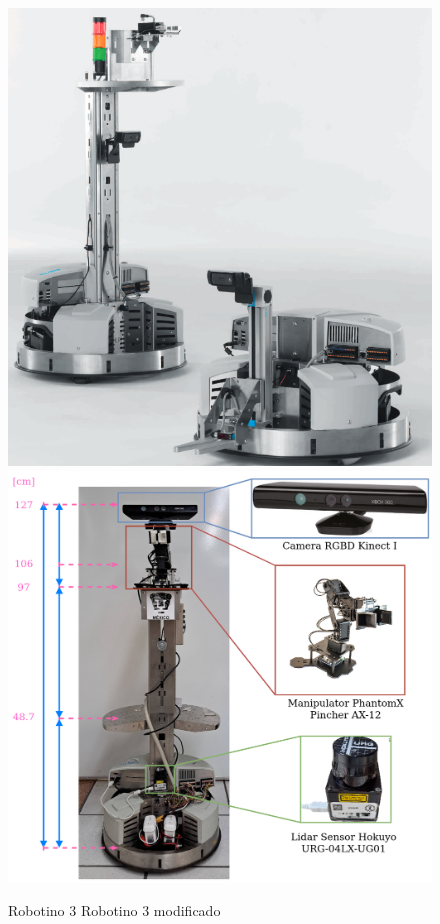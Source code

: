             \begin{figure}[H]
                \centering
                \includegraphics[scale=0.3]{Figures/RobotinoFESTO_base+torre.png}\quad \includegraphics[scale=0.17]{Figures/Festino2023_medidas.png}                
                    \caption{Robotino 3 \cite{festo-didactic-robotino-2013} \qquad\qquad\quad\phantom{-}\qquad Robotino 3 modificado}
                    \label{fig:Robotino}
            \end{figure}
            
